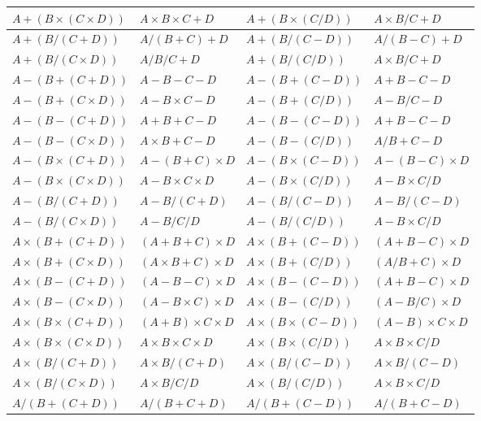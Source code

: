 \documentclass[11pt]{article}
\begin{document}
\begin{table}[htbp]
{\begin{tabular}{|l|l|l|l|}
$A+(B \times (C \times D))$ & $A \times B \times C+D$ & $A+(B \times (C/D))$ & $A \times B/C+D$  \\ \hline
$A+(B/(C+D))$ & $A/(B+C)+D$ & $A+(B/(C-D))$ & $A/(B-C)+D$  \\ \hline
$A+(B/(C \times D))$ & $A/B/C+D$ & $A+(B/(C/D))$ & $A \times B/C+D$  \\ \hline
$A-(B+(C+D))$ & $A-B-C-D$ & $A-(B+(C-D))$ & $A+B-C-D$  \\ \hline
$A-(B+(C \times D))$ & $A-B \times C-D$ & $A-(B+(C/D))$ & $A-B/C-D$  \\ \hline
$A-(B-(C+D))$ & $A+B+C-D$ & $A-(B-(C-D))$ & $A+B-C-D$  \\ \hline
$A-(B-(C \times D))$ & $A \times B+C-D$ & $A-(B-(C/D))$ & $A/B+C-D$  \\ \hline
$A-(B \times (C+D))$ & $A-(B+C) \times D$ & $A-(B \times (C-D))$ & $A-(B-C) \times D$  \\ \hline
$A-(B \times (C \times D))$ & $A-B \times C \times D$ & $A-(B \times (C/D))$ & $A-B \times C/D$  \\ \hline
$A-(B/(C+D))$ & $A-B/(C+D)$ & $A-(B/(C-D))$ & $A-B/(C-D)$  \\ \hline
$A-(B/(C \times D))$ & $A-B/C/D$ & $A-(B/(C/D))$ & $A-B \times C/D$  \\ \hline
$A \times (B+(C+D))$ & $(A+B+C) \times D$ & $A \times (B+(C-D))$ & $(A+B-C) \times D$  \\ \hline
$A \times (B+(C \times D))$ & $(A \times B+C) \times D$ & $A \times (B+(C/D))$ & $(A/B+C) \times D$  \\ \hline
$A \times (B-(C+D))$ & $(A-B-C) \times D$ & $A \times (B-(C-D))$ & $(A+B-C) \times D$  \\ \hline
$A \times (B-(C \times D))$ & $(A-B \times C) \times D$ & $A \times (B-(C/D))$ & $(A-B/C) \times D$  \\ \hline
$A \times (B \times (C+D))$ & $(A+B) \times C \times D$ & $A \times (B \times (C-D))$ & $(A-B) \times C \times D$  \\ \hline
$A \times (B \times (C \times D))$ & $A \times B \times C \times D$ & $A \times (B \times (C/D))$ & $A \times B \times C/D$  \\ \hline
$A \times (B/(C+D))$ & $A \times B/(C+D)$ & $A \times (B/(C-D))$ & $A \times B/(C-D)$  \\ \hline
$A \times (B/(C \times D))$ & $A \times B/C/D$ & $A \times (B/(C/D))$ & $A \times B \times C/D$  \\ \hline
$A/(B+(C+D))$ & $A/(B+C+D)$ & $A/(B+(C-D))$ & $A/(B+C-D)$  \\ \hline

\end{tabular}}
\end{table}
\end{document}
